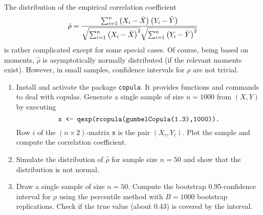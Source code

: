 \documentclass{article}
\begin{document}
The distribution of the empirical correlation coefficient
\begin{equation*}
\hat{\rho}=\frac{\sum_{i=1}^{n}\left( X_{i}-\bar{X}\right) \left( Y_{i}-\bar{%
Y}\right) }{\sqrt{\sum_{i=1}^{n}\left( X_{i}-\bar{X}\right) ^{2}}\sqrt{%
\sum_{i=1}^{n}\left( Y_{i}-\bar{Y}\right) ^{2}}}
\end{equation*}%
is rather complicated except for some special cases. Of course, being based
on moments, $\hat{\rho}$ is asymptotically normally distributed (if the
relevant moments exist). However, in small samples, confidence intervals for
$\rho $ are not trivial.

\begin{enumerate}
\item Install and activate the package \texttt{copula}. It provides
functions and commands to deal with copulas. Generate a single sample of
size $n=1000$ from $\left( X,Y\right) $ by executing
\begin{equation*}
\text{\texttt{x <- qexp(rcopula(gumbelCopula(1.3),1000)).}}
\end{equation*}%
Row $i$ of the $\left( n\times 2\right) $-matrix \texttt{x} is the pair $%
(X_{i},Y_{i})$. Plot the sample and compute the correlation coefficient.

\item Simulate the distribution of $\hat{\rho}$ for sample size $n=50$ and
show that the distribution is not normal.

\item Draw a single sample of size $n=50$. Compute the bootstrap
0.95-confidence interval for $\rho $ using the percentile method with $%
B=1000 $ bootstrap replications. Check if the true value (about 0.43) is
covered by the interval.
\end{enumerate}
\end{document}
